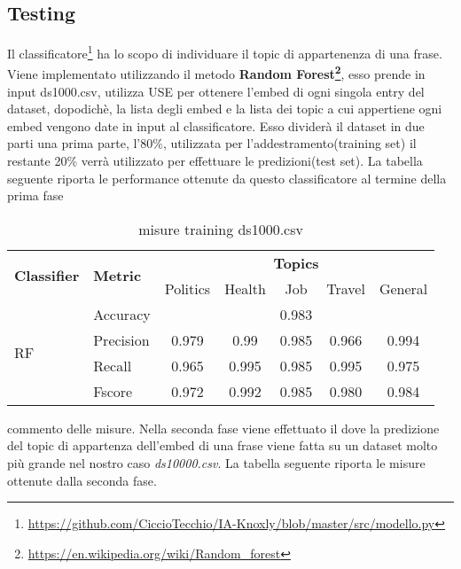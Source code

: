\subsection{Testing}
Il classificatore\footnote{\url{https://github.com/CiccioTecchio/IA-Knoxly/blob/master/src/modello.py}} ha lo scopo di individuare il topic di appartenenza di una frase.\newline
Viene implementato utilizzando il metodo \textbf{Random Forest\footnote{\url{https://en.wikipedia.org/wiki/Random_forest}}}, 
esso prende in input ds1000.csv, utilizza USE per ottenere l'embed di ogni singola entry del dataset, dopodichè, la lista degli embed e la lista dei topic a cui appertiene ogni embed vengono date in input al classificatore. Esso dividerà il dataset in due parti una prima parte, l'80\%, utilizzata per l'addestramento(training set) il restante 20\% verrà utilizzato per effettuare le predizioni(test set).\newline
La tabella seguente riporta le performance ottenute da questo classificatore al termine della prima fase
\begin{table}[h]
\begin{tabular}{|l|l|c|c|c|c|c|}
\hline
\multirow{2}{*}{\textbf{Classifier}} & \multirow{2}{*}{\textbf{Metric}} & \multicolumn{5}{c|}{\textbf{Topics}} \\ \cline{3-7} 
 &  & Politics & Health & Job & Travel & General \\ \hline
\multirow{4}{*}{RF} & Accuracy & \multicolumn{5}{c|}{0.983} \\ \cline{2-7} 
 & Precision & 0.979 & 0.99 & 0.985 & 0.966 & 0.994 \\ \cline{2-7} 
 & Recall & 0.965 & 0.995 & 0.985  & 0.995 & 0.975 \\ \cline{2-7} 
 & Fscore & 0.972 & 0.992 & 0.985 & 0.980 & 0.984 \\ \hline
\end{tabular}
\caption{misure training ds1000.csv}
\end{table}
\FloatBarrier
commento delle misure.\newline
Nella seconda fase viene effettuato il  dove la predizione del topic di appartenza dell'embed di una frase viene fatta su un dataset molto più grande nel nostro caso \textit{ds10000.csv}.\newline
La tabella seguente riporta le misure ottenute dalla seconda fase. 
